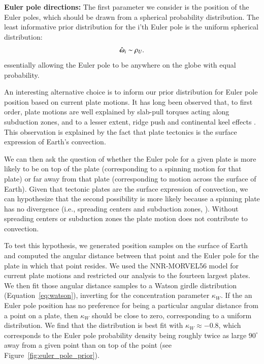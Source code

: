 \documentclass[preprint,12pt,authoryear]{elsarticle}
\newcommand{\mitbf}[1]{\hbox{\mathversion{bold}$#1$}}
\begin{document}
\textbf{Euler pole directions:} 
The first parameter we consider is the position of the Euler poles, which should be drawn
from a spherical probability distribution.
The least informative prior distribution for the i'th Euler pole is the uniform spherical distribution:
\begin{equation}
\hat{\mitbf{\omega}}_i \sim \rho_U.
\end{equation}
essentially allowing the Euler pole to be anywhere on the globe with equal probability.

An interesting alternative choice is to inform our prior distribution for Euler pole position based
on current plate motions. It has long been observed that, to first order, plate motions
are well explained by slab-pull torques acting along subduction zones, and to a lesser
extent, ridge push and continental keel effects \citep{forsyth1975relative, gordon1978absolute, richardson1992ridge}.
This observation is explained by the fact that plate tectonics is the 
surface expression of Earth's convection.

We can then ask the question of whether the Euler pole for a given plate is more likely
to be on top of the plate (corresponding to a spinning motion for that plate) or far away
from that plate (corresponding to motion across the surface of Earth).
Given that tectonic plates are the surface expression of convection, 
we can hypothesize that the second possibility is more likely because a spinning plate has no divergence 
(i.e., spreading centers and subduction zones, \citep{forte1987plate, gable1991convection}). 
Without spreading centers or subduction zones the plate motion does not contribute to convection.

To test this hypothesis, we generated position samples on the surface of Earth and computed
the angular distance between that point and the Euler pole for the plate in which that point resides.
We used the NNR-MORVEL56 model for current plate motions \cite{argus2011geologically}
and restricted our analysis to the fourteen largest plates.
We then fit those angular distance samples to a Watson girdle distribution (Equation~\eqref{eq:watson}), 
inverting for the concentration parameter $\kappa_W$.
If the an Euler pole position has no preference for being a particular angular distance from
a point on a plate, then $\kappa_W$ should be close to zero, corresponding to a uniform distribution.
We find that the distribution is best fit with $\kappa_W \approx -0.8$, which corresponds
to the Euler pole probability density being roughly twice as large $90^\circ$
away from a given point than on top of the point (see Figure~\ref{fig:euler_pole_prior}).
\end{document}
